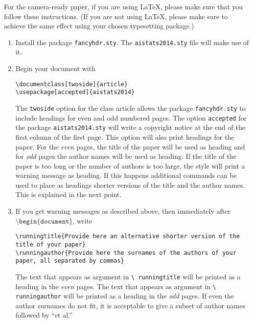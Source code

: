 \documentclass[twoside]{article}
\begin{document}
For the camera-ready paper, if you are using \LaTeX, please make sure
that you follow these instructions.  (If you are not using \LaTeX,
please make sure to achieve the same effect using your chosen
typesetting package.)

\begin{enumerate}
    \item Install the package \texttt{fancyhdr.sty}. The
    \texttt{aistats2014.sty} file will make use of it.
    \item Begin your document with
    \begin{flushleft}
    \texttt{\textbackslash documentclass[twoside]\{article\}}\\
    \texttt{\textbackslash usepackage[accepted]\{aistats2014\}}
    \end{flushleft}
    The \texttt{twoside} option for the class article allows the
    package \texttt{fancyhdr.sty} to include headings for even and odd
    numbered pages. The option \texttt{accepted} for the package
    \texttt{aistats2014.sty} will write a copyright notice at the end of
    the first column of the first page. This option will also print
    headings for the paper.  For the \emph{even} pages, the title of
    the paper will be used as heading and for \emph{odd} pages the
    author names will be used as heading.  If the title of the paper
    is too long or the number of authors is too large, the style will
    print a warning message as heading. If this happens additional
    commands can be used to place as headings shorter versions of the
    title and the author names. This is explained in the next point.
    \item  If you get warning messages as described above, then
    immediately after $\texttt{\textbackslash
    begin\{document\}}$, write
    \begin{flushleft}
    \texttt{\textbackslash runningtitle\{Provide here an alternative shorter version of the title of your
    paper\}}\\
    \texttt{\textbackslash runningauthor\{Provide here the surnames of the authors of your paper, all separated by
    commas\}}
    \end{flushleft}
    The text that appears as argument in \texttt{\textbackslash
      runningtitle} will be printed as a heading in the \emph{even}
    pages. The text that appears as argument in \texttt{\textbackslash
      runningauthor} will be printed as a heading in the \emph{odd}
    pages.  If even the author surnames do not fit, it is acceptable
    to give a subset of author names followed by ``et al.''


\end{enumerate}
\end{document}
